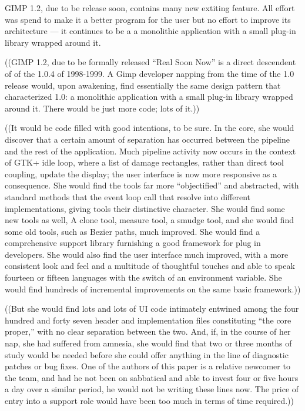 
GIMP 1.2, due to be release soon, contains many new extiting feature. All effort was spend to make it a better program for the user but no effort to improve its architecture --- it continues to be a a monolithic application with a small plug-in library wrapped around it. 


((GIMP 1.2, due to be formally released ``Real Soon Now'' is a direct
descendent of of the 1.0.4 of 1998-1999. A Gimp developer napping from
the time of the 1.0 release would, upon awakening, find essentially
the same design pattern that characterized 1.0: a monolithic
application with a small plug-in library wrapped around it. There
would be just more code; lots of it.))

((It would be code filled with good intentions, to be sure. In the core,
she would discover that a certain amount of separation has occurred
between the pipeline and the rest of the application. Much pipeline
activity now occurs in the context of GTK+ idle loop, where a list of
damage rectangles, rather than direct tool coupling, update the
display; the user interface is now more responsive as a
consequence. She would find the tools far more ``objectified'' and
abstracted, with standard methods that the event loop call that
resolve into different implementations, giving tools their distinctive
character. She would find some new tools as well, A clone tool,
measure tool, a smudge tool, and she would find some old tools, such
as Bezier paths, much improved. She would find a comprehensive support
library furnishing a good framework for plug in developers. She would
also find the user interface much improved, with a more consistent
look and feel and a multitude of thoughtful touches and able to speak
fourteen or fifteen languages with the switch of an environment
variable. She would find hundreds of incremental improvements on the
same basic framework.))

((But she would find lots and lots of UI code intimately entwined among
the four hundred and forty seven header and implementation files
constituting ``the core proper,'' with no clear separation between the
two. And, if, in the course of her nap, she had suffered from amnesia,
she would find that two or three months of study would be needed
before she could offer anything in the line of diagnostic patches or
bug fixes. One of the authors of this paper is a relative newcomer to
the team, and had he not been on sabbatical and able to invest four or
five hours a day over a similar period, he would not be writing these
lines now. The price of entry into a support role would have been too
much in terms of time required.))
 
